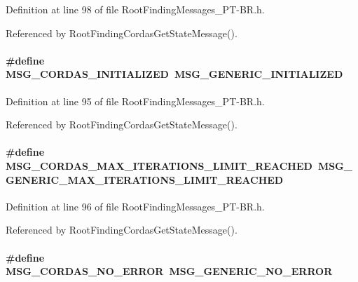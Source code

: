 Definition at line 98 of file RootFindingMessages\_\-PT-BR.h.

Referenced by RootFindingCordasGetStateMessage().\hypertarget{group____messages_g65513cb1fdadbdf469b3e7ebfd3368fd}{
\paragraph[MSG\_\-CORDAS\_\-INITIALIZED]{\setlength{\rightskip}{0pt plus 5cm}\#define MSG\_\-CORDAS\_\-INITIALIZED~MSG\_\-GENERIC\_\-INITIALIZED}\hfill}
\label{group____messages_g65513cb1fdadbdf469b3e7ebfd3368fd}




Definition at line 95 of file RootFindingMessages\_\-PT-BR.h.

Referenced by RootFindingCordasGetStateMessage().\hypertarget{group____messages_gbf2eaacf66da6f1a3ff81d41a6d494ea}{
\paragraph[MSG\_\-CORDAS\_\-MAX\_\-ITERATIONS\_\-LIMIT\_\-REACHED]{\setlength{\rightskip}{0pt plus 5cm}\#define MSG\_\-CORDAS\_\-MAX\_\-ITERATIONS\_\-LIMIT\_\-REACHED~MSG\_\-GENERIC\_\-MAX\_\-ITERATIONS\_\-LIMIT\_\-REACHED}\hfill}
\label{group____messages_gbf2eaacf66da6f1a3ff81d41a6d494ea}




Definition at line 96 of file RootFindingMessages\_\-PT-BR.h.

Referenced by RootFindingCordasGetStateMessage().\hypertarget{group____messages_ge43ef9f2448a816d8f5a66a10be9ecc6}{
\paragraph[MSG\_\-CORDAS\_\-NO\_\-ERROR]{\setlength{\rightskip}{0pt plus 5cm}\#define MSG\_\-CORDAS\_\-NO\_\-ERROR~MSG\_\-GENERIC\_\-NO\_\-ERROR}\hfill}
\label{group____messages_ge43ef9f2448a816d8f5a66a10be9ecc6}




